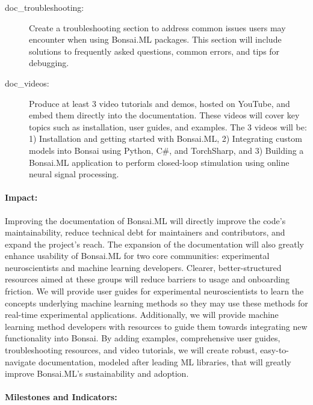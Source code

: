 \begin{description}
    \item[doc\_troubleshooting:] Create a troubleshooting section to address common issues users may encounter when using Bonsai.ML packages. This section will include solutions to frequently asked questions, common errors, and tips for debugging.
    
    \item[doc\_videos:] Produce at least 3 video tutorials and demos, hosted on YouTube, and embed them directly into the documentation. These videos will cover key topics such as installation, user guides, and examples. The 3 videos will be: 1) Installation and getting started with Bonsai.ML, 2) Integrating custom models into Bonsai using Python, C\#, and TorchSharp, and 3) Building a Bonsai.ML application to perform closed-loop stimulation using online neural signal processing.

\end{description}

\paragraph{Impact:}
Improving the documentation of Bonsai.ML will directly improve the code's maintainability, reduce technical debt for maintainers and contributors, and expand the project's reach. The expansion of the documentation will also greatly enhance usability of Bonsai.ML for two core communities: experimental neuroscientists and machine learning developers. Clearer, better-structured resources aimed at these groups will reduce barriers to usage and onboarding friction. We will provide user guides for experimental neuroscientists to learn the concepts underlying machine learning methods so they may use these methods for real-time experimental applications. Additionally, we will provide machine learning method developers with resources to guide them towards integrating new functionality into Bonsai. By adding examples, comprehensive user guides, troubleshooting resources, and video tutorials, we will create robust, easy-to-navigate documentation, modeled after leading ML libraries, that will greatly improve Bonsai.ML's sustainability and adoption.

\paragraph{Milestones and Indicators:}\mbox{}\\

